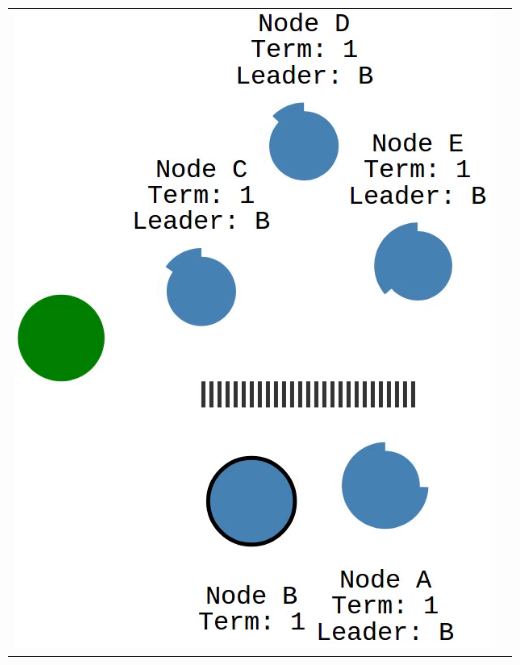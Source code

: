 \begin{tabularx}{\textwidth}{ |X|X| }
  \hline
  \includegraphics[scale=0.28]{scenarios/network_partition/0380.png} &

\end{tabularx}
